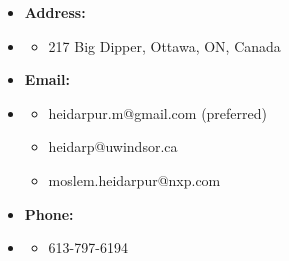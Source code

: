\documentclass[12pt,oneside]{book}
\begin{document}
\begin {itemize}
\begin {itemize}
\end {itemize}   \vspace{0.5em}
\item  [] {\bf  Address:} \vspace{-1.5em}
\item []  {\bf \hrulefill } \vspace{-1em}
\begin {itemize} 
\item  \small 217 Big Dipper, Ottawa, ON, Canada
\end{itemize}  \vspace{0.5em}
\item  []  {\bf  Email:} \vspace{-1.5em}
\item []  {\bf \hrulefill } \vspace{-1em}
\begin {itemize} 
 \item  \small heidarpur.m@gmail.com (preferred)
 \item \small heidarp@uwindsor.ca
 \item \small moslem.heidarpur@nxp.com
\end {itemize}   \vspace{0.5em}
\item  []   {\bf Phone:} \vspace{-1.5em}
\item []  {\bf \hrulefill } \vspace{-1em}
\begin {itemize} 
\item 613-797-6194
\end{itemize}
\end{itemize}

\newpage
 
\newpage

\newpage

\newpage

\newpage

\newpage




\newpage


%
%
\newpage

\newpage
%
%

 
 
  
  
    
 
 
 
\end{document}

